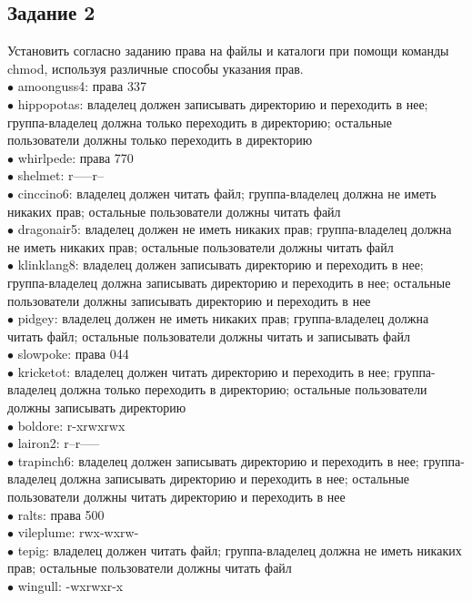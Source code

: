 \subsection*{Задание 2}
Установить согласно заданию права на файлы и каталоги при помощи команды chmod, используя различные способы указания прав. \\ 
$\bullet$ amoonguss4: права 337 \\
$\bullet$ hippopotas: владелец должен записывать директорию и переходить в нее; группа-владелец должна только переходить в директорию; остальные пользователи должны только переходить в директорию \\
$\bullet$ whirlpede: права 770 \\
$\bullet$ shelmet: r-----r-- \\
$\bullet$ cinccino6: владелец должен читать файл; группа-владелец должна не иметь никаких прав; остальные пользователи должны читать файл \\
$\bullet$ dragonair5: владелец должен не иметь никаких прав; группа-владелец должна не иметь никаких прав; остальные пользователи должны читать файл \\
$\bullet$ klinklang8: владелец должен записывать директорию и переходить в нее; группа-владелец должна записывать директорию и переходить в нее; остальные пользователи должны записывать директорию и переходить в нее \\
$\bullet$ pidgey: владелец должен не иметь никаких прав; группа-владелец должна читать файл; остальные пользователи должны читать и записывать файл \\
$\bullet$ slowpoke: права 044 \\
$\bullet$ kricketot: владелец должен читать директорию и переходить в нее; группа-владелец должна только переходить в директорию; остальные пользователи должны записывать директорию \\
$\bullet$ boldore: r-xrwxrwx \\
$\bullet$ lairon2: r--r----- \\
$\bullet$ trapinch6: владелец должен записывать директорию и переходить в нее; группа-владелец должна записывать директорию и переходить в нее; остальные пользователи должны читать директорию и переходить в нее \\
$\bullet$ ralts: права 500 \\
$\bullet$ vileplume: rwx-wxrw- \\
$\bullet$ tepig: владелец должен читать файл; группа-владелец должна не иметь никаких прав; остальные пользователи должны читать файл \\
$\bullet$ wingull: -wxrwxr-x
